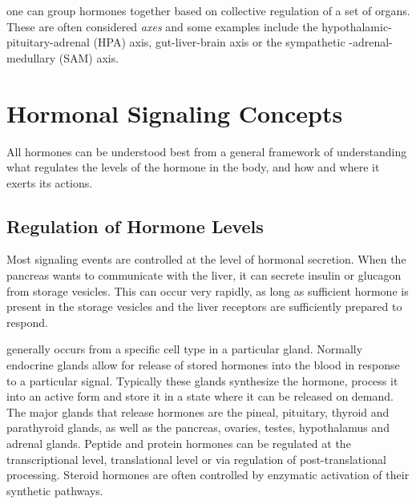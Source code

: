 \documentclass{tufte-handout}
\begin{document}
 one can group hormones together based on collective regulation  of a set of organs.  These are often considered \emph{axes} and some examples include the hypothalamic-pituitary-adrenal (HPA) axis, gut-liver-brain axis or the sympathetic -adrenal-medullary (SAM) axis. 

\section{Hormonal Signaling Concepts}

All hormones can be understood best from a general framework of understanding what regulates the levels of the hormone in the body, and how and where it exerts its actions.

\subsection{Regulation of Hormone Levels}

Most signaling events are controlled at the level of hormonal secretion.  When the pancreas wants to communicate with the liver, it can secrete insulin or glucagon from storage vesicles.  This can occur very rapidly, as long as sufficient hormone is present in the storage vesicles and the liver receptors are sufficiently prepared to respond.

 generally occurs from a specific cell type in a particular gland.  Normally endocrine glands allow for release of stored hormones into the blood in response to a particular signal.  Typically these glands synthesize the hormone, process it into an active form and store it in a state where it can be released on demand.  The major glands that release hormones are the pineal, pituitary, thyroid and parathyroid glands, as well as the pancreas, ovaries, testes, hypothalamus and adrenal glands.  Peptide and protein hormones can be regulated at the transcriptional level, translational level or via regulation of post-translational processing.  Steroid hormones are often controlled by enzymatic activation of their synthetic pathways.  
\end{document}
